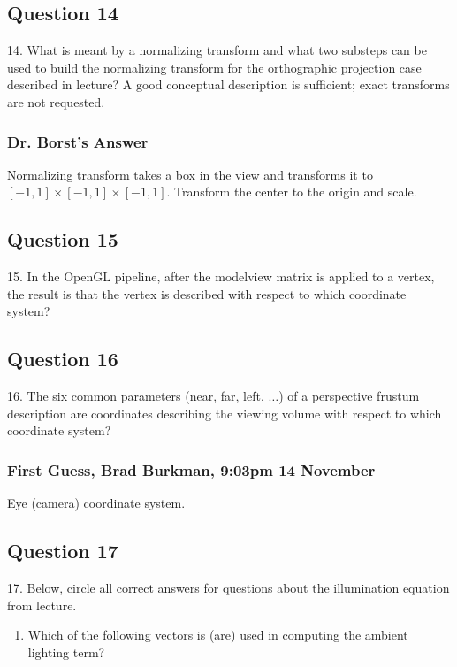 \documentclass[11pt]{article}
\begin{document}
\begin{spacing}{1.2}
\subsection{Question 14}
14.  What is meant by a normalizing transform and what two substeps can be used to build the normalizing transform for the orthographic projection case described in lecture?  A good conceptual description is sufficient; exact transforms are not requested.

\subsubsection{Dr. Borst's Answer}

Normalizing transform takes a box in the view and transforms it to $[-1,1]\times [-1,1] \times [-1,1]$.  Transform the center to the origin and scale.  

\subsection{Question 15}
15.  In the OpenGL pipeline, after the modelview matrix is applied to a vertex, the result is that the vertex is described with respect to which coordinate system?

\subsection{Question 16}
16.  The six common parameters (near, far, left, $\dots$) of a perspective frustum description are coordinates describing the viewing volume with respect to which coordinate system?

\subsubsection{First Guess, Brad Burkman, 9:03pm 14 November}

Eye (camera) coordinate system.

\subsection{Question 17}
17.  Below, circle all correct answers for questions about the illumination equation from lecture.  

\begin{enumerate}[label=\arabic*)]
	\item Which of the following vectors is (are) used in computing the ambient lighting term?
	

\end{enumerate}
\end{spacing}
\end{document}

